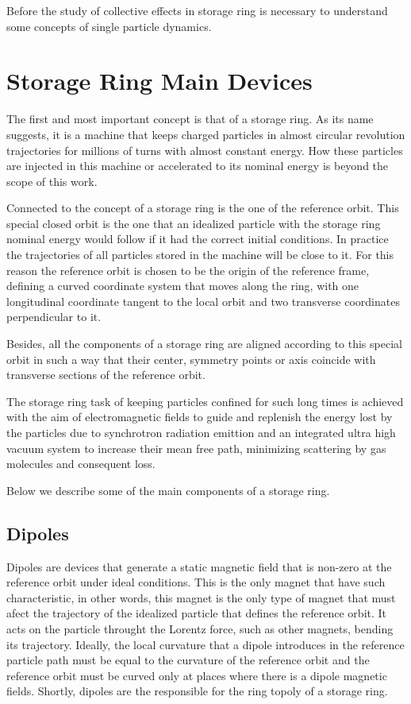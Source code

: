 \documentclass[
	12pt,				%
	openright,			%
	oneside,			%
	a4paper,		%
	chapter=TITLE,		%
	section=TITLE,		%
    brazil,				%
	english,			%
	sumario=tradicional,
	]{abntex2}
\begin{document}
Before the study of collective effects in storage ring is necessary to understand some concepts of single particle dynamics.

  \section{Storage Ring Main Devices} \label{ssec:storage_ring_main_devices}

  The first and most important concept is that of a storage ring. As its name suggests, it is a machine that keeps charged particles in almost circular revolution trajectories for millions of turns with almost constant energy. How these particles are injected in this machine or accelerated to its nominal energy is beyond the scope of this work.

  Connected to the concept of a storage ring is the one of the reference orbit. This special closed orbit is the one that an idealized particle with the storage ring nominal energy would follow if it had the correct initial conditions. In practice the trajectories of all particles stored in the machine will be close to it. For this reason the reference orbit is chosen to be the origin of the reference frame, defining a curved coordinate system that moves along the ring, with one longitudinal coordinate tangent to the local orbit and two transverse coordinates perpendicular to it.

  Besides, all the components of a storage ring are aligned according to this special orbit in such a way that their center, symmetry points or axis coincide with transverse sections of the reference orbit.

  The storage ring task of keeping particles confined for such long times is achieved with the aim of electromagnetic fields to guide and replenish the energy lost by the particles due to synchrotron radiation emittion and an integrated ultra high vacuum system to increase their mean free path, minimizing scattering by gas molecules and consequent loss.

  Below we describe some of the main components of a storage ring.

    \subsection{Dipoles}

    Dipoles are devices that generate a static magnetic field that is non-zero at the reference orbit under ideal conditions. This is the only magnet that have such characteristic, in other words, this magnet is the only type of magnet that must afect the trajectory of the idealized particle that defines the reference orbit. It acts on the particle throught the Lorentz force, such as other magnets, bending its trajectory. Ideally, the local curvature that a dipole introduces in the reference particle path must be equal to the curvature of the reference orbit and the reference orbit must be curved only at places where there is a dipole magnetic fields. Shortly, dipoles are the responsible for the ring topoly of a storage ring.
\end{document}
